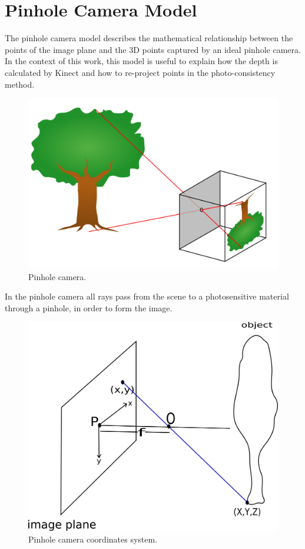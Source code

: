 
\section{Pinhole Camera Model}

The pinhole camera model describes the mathematical relationship between the points of the image plane and the 3D points captured by an 
ideal pinhole camera. In the context of this work, this model is useful to explain how the depth is calculated by Kinect and 
how to re-project points in the photo-consistency method.

\begin{figure}[H]
\begin{center}
\includegraphics[scale=0.15]{images/pinhole-camera}
\caption{Pinhole camera.}
\label{fig:pinhole}
\end{center}
\end{figure}

In the pinhole camera all rays pass from the scene to a photosensitive material through a pinhole, in order to form the image.

\begin{figure}[H]
\begin{center}
\includegraphics[scale=1]{images/pinhole-coordinates}
\caption{Pinhole camera coordinates system.}
\label{fig:pinhole-c}
\end{center}
\end{figure}

